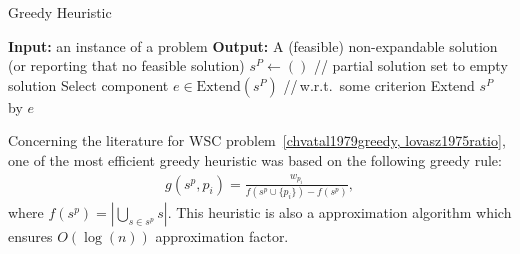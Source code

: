 \documentclass[runningheads,a4paper]{elsarticle}
\begin{document}
          \begin{algorithm}[!t]
          	\caption{Greedy Heuristic}\label{alg:greedy}
          	\begin{algorithmic}[1]
          		\State \textbf{Input:} an instance of a problem
          		\State \textbf{Output:} A (feasible) non-expandable solution (or reporting that no feasible solution)
          		\State $s^{P} \gets ()$ \hspace{0.3cm}// partial solution set to empty solution
          		\State Select component $e \in  \text{Extend}(s^{P})$ \hspace{0.3cm}//\,w.r.t.\  some criterion
          		\State Extend $s^{P}$ by $e$
          		\EndWhile
          	\end{algorithmic}
          \end{algorithm}
      Concerning the literature for WSC problem~\ref{chvatal1979greedy, lovasz1975ratio}, one of the most efficient greedy heuristic was based on the following greedy rule:
     \begin{align}
     g(s^p, p_i) = \frac{w_{p_i}}{ f(s^p \cup \{p_i\})  - f(s^p)},
     \end{align}
     where $f(s^p) = |\bigcup_{s \in s^p} s |$.
     This heuristic is also a approximation algorithm which ensures $O(\log(n))$ approximation factor. 
\end{document}
